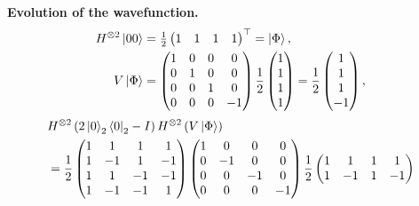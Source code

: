 \documentclass[a4paper, 10pt]{article}
\begin{document}
\begin{solution}
	\noindent \textbf{Evolution of the wavefunction.}
	\begin{align*}
		H^{\otimes 2}\ket{00} & = \tfrac{1}{2}\begin{pmatrix} 1 & 1 & 1 & 1 \end{pmatrix}^{\top} = \ket{\Phi},                                                         \\
		V\ket{\Phi}           & = \begin{pmatrix}
			                          1 & 0 & 0 & 0  \\
			                          0 & 1 & 0 & 0  \\
			                          0 & 0 & 1 & 0  \\
			                          0 & 0 & 0 & -1
		                          \end{pmatrix}\frac{1}{2}\begin{pmatrix} 1 \\ 1 \\ 1 \\ 1 \end{pmatrix} = \frac{1}{2}\begin{pmatrix} 1 \\ 1 \\ 1 \\ -1 \end{pmatrix},
	\end{align*}
	\begin{align*}
		 & H^{\otimes 2}\left(2\ket{0}_2\bra{0}_2 - I\right)H^{\otimes 2}\left(V\ket{\Phi}\right)                                                       \\
		 & = \frac{1}{2}\begin{pmatrix}
			                1 & 1  & 1  & 1  \\
			                1 & -1 & 1  & -1 \\
			                1 & 1  & -1 & -1 \\
			                1 & -1 & -1 & 1
		                \end{pmatrix}
		\begin{pmatrix}
			1 & 0  & 0  & 0  \\
			0 & -1 & 0  & 0  \\
			0 & 0  & -1 & 0  \\
			0 & 0  & 0  & -1
		\end{pmatrix}
		\frac{1}{2}\begin{pmatrix}
			           1 & 1  & 1  & 1  \\
			           1 & -1 & 1  & -1 \\

\end{pmatrix}
\end{align*}
\end{solution}
\end{document}
